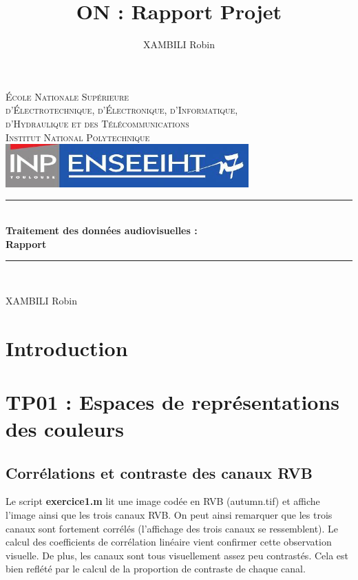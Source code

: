 \documentclass[a4paper,12pt]{article}
\title{ON : Rapport Projet}
\author{XAMBILI Robin}
\date{}
\theoremstyle{break}
\newcommand{\HRule}{\rule{\linewidth}{0.5mm}}
\begin{document}
\makeatletter
  \begin{titlepage}
  \centering
      {\large \textsc{École Nationale Supérieure \\ d'Électrotechnique, d'Électronique, d'Informatique, \\ d'Hydraulique et des Télécommunications}}\\ \vspace{0.50cm}
      \textsc{Institut National Polytechnique}\\
    \vspace{1cm}
      \includegraphics[width=0.7\textwidth]{img/n7.jpg}
  
    \vspace{3.5cm}
    \HRule \\[0.3cm]
    { \huge \bfseries Traitement des données audiovisuelles : \\ \vspace{3mm} Rapport \\ 
    }
    \HRule \\[2cm]
    \vfill
    \vspace{2em}
             
    \large XAMBILI Robin
    \vfill
    \newpage
    \renewcommand{\contentsname}{SOMMAIRE}
    \tableofcontents
  \end{titlepage}


\section{Introduction}
\newpage


\section{TP01 : Espaces de représentations des couleurs}

\subsection{Corrélations et contraste des canaux RVB}

Le script \textbf{exercice1.m} lit une image codée en RVB (autumn.tif) et affiche l'image ainsi que les trois canaux RVB. On peut ainsi remarquer que les trois canaux sont fortement corrélés (l'affichage des trois canaux se ressemblent). Le calcul des coefficients de corrélation linéaire vient confirmer cette observation visuelle. De plus, les canaux sont tous visuellement assez peu contrastés. Cela est bien reflété par le calcul de la proportion de contraste de chaque canal.
\end{document}
